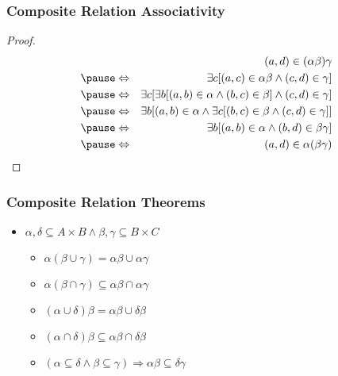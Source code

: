 \documentclass[dvipsnames]{beamer}
\begin{document}
\begin{frame}
  \frametitle{Composite Relation Associativity}

  \begin{proof}
    \begin{eqnarray*}
      &                 & (a,d) \in (\alpha \beta)\gamma\\\pause
      & \Leftrightarrow & \exists c [(a,c) \in \alpha \beta
                              \wedge (c,d) \in \gamma]\\\pause
      & \Leftrightarrow & \exists c [\exists b [(a,b) \in \alpha
                                         \wedge (b,c) \in \beta]
                                         \wedge (c,d) \in \gamma]\\\pause
      & \Leftrightarrow & \exists b [(a,b) \in \alpha
                              \wedge \exists c [(b,c) \in \beta
                              \wedge (c,d) \in \gamma]]\\\pause
      & \Leftrightarrow & \exists b [(a,b) \in \alpha
                              \wedge (b,d) \in \beta \gamma]\\\pause
      & \Leftrightarrow & (a,d) \in \alpha (\beta \gamma)
    \end{eqnarray*}
  \end{proof}
\end{frame}

\begin{frame}
  \frametitle{Composite Relation Theorems}

  \begin{itemize}
    \item $\alpha , \delta \subseteq A \times B \wedge
           \beta , \gamma \subseteq B \times C$

    \begin{itemize}
      \item $\alpha (\beta \cup \gamma) = \alpha \beta \cup \alpha \gamma$

      \pause
      \item $\alpha (\beta \cap \gamma)
        \subseteq \alpha \beta \cap \alpha \gamma$

      \pause
      \item $(\alpha \cup \delta) \beta = \alpha \beta \cup \delta \beta$

      \pause
      \item $(\alpha \cap \delta) \beta
        \subseteq \alpha \beta \cap \delta \beta$

      \pause
      \item $(\alpha \subseteq \delta \wedge \beta \subseteq \gamma)
        \Rightarrow \alpha \beta \subseteq \delta \gamma$
    \end{itemize}
  \end{itemize}
\end{frame}
\end{document}
